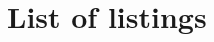 \section{List of listings}\label{sec:list-of-listings}

\begingroup
\hypersetup{hidelinks}
\lstlistoflistings
\endgroup